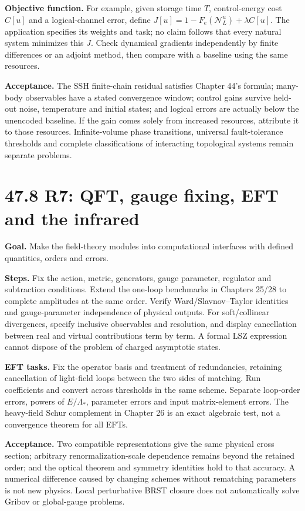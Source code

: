 \documentclass[
  11pt,
  oneside]{book}
\begin{document}
\textbf{Objective function.} For example, given storage time \(T\),
control-energy cost \(C[u]\) and a logical-channel error, define
\(J[u]=1-F_e(\mathcal N_L^u)+\lambda C[u]\). The application specifies
its weights and task; no claim follows that every natural system
minimizes this \(J\). Check dynamical gradients independently by finite
differences or an adjoint method, then compare with a baseline using the
same resources.

\textbf{Acceptance.} The SSH finite-chain residual satisfies Chapter
44's formula; many-body observables have a stated convergence window;
control gains survive held-out noise, temperature and initial states;
and logical errors are actually below the unencoded baseline. If the
gain comes solely from increased resources, attribute it to those
resources. Infinite-volume phase transitions, universal fault-tolerance
thresholds and complete classifications of interacting topological
systems remain separate problems.

\section{47.8 R7: QFT, gauge fixing, EFT and the infrared}

\textbf{Goal.} Make the field-theory modules into computational
interfaces with defined quantities, orders and errors.

\textbf{Steps.} Fix the action, metric, generators, gauge parameter,
regulator and subtraction conditions. Extend the one-loop benchmarks in
Chapters 25/28 to complete amplitudes at the same order. Verify
Ward/Slavnov--Taylor identities and gauge-parameter independence of
physical outputs. For soft/collinear divergences, specify inclusive
observables and resolution, and display cancellation between real and
virtual contributions term by term. A formal LSZ expression cannot
dispose of the problem of charged asymptotic states.

\textbf{EFT tasks.} Fix the operator basis and treatment of
redundancies, retaining cancellation of light-field loops between the
two sides of matching. Run coefficients and convert across thresholds in
the same scheme. Separate loop-order errors, powers of \(E/\Lambda_*\),
parameter errors and input matrix-element errors. The heavy-field Schur
complement in Chapter 26 is an exact algebraic test, not a convergence
theorem for all EFTs.

\textbf{Acceptance.} Two compatible representations give the same
physical cross section; arbitrary renormalization-scale dependence
remains beyond the retained order; and the optical theorem and symmetry
identities hold to that accuracy. A numerical difference caused by
changing schemes without rematching parameters is not new physics. Local
perturbative BRST closure does not automatically solve Gribov or
global-gauge problems.
\end{document}
